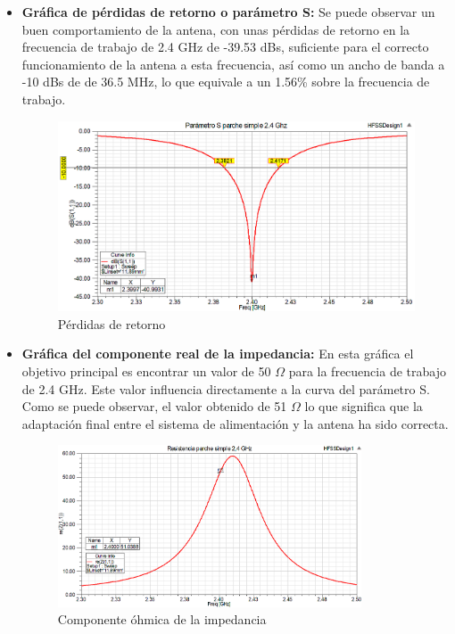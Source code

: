 \begin{itemize}
\item \textbf{Gráfica de pérdidas de retorno o parámetro S: }Se puede observar un buen comportamiento de la antena, con unas pérdidas de retorno en la frecuencia de trabajo de 2.4 GHz de -39.53 dBs, suficiente para el correcto funcionamiento de la antena a esta frecuencia, así como un ancho de banda a -10 dBs de de 36.5 MHz, lo que equivale a un 1.56\% sobre la frecuencia de trabajo.
	\begin{figure}[H]
    \centering
        \includegraphics[width=\textwidth]{archivos/analisis/1x11/1}
        \caption{Pérdidas de retorno}
        \label{fig:s}
	\end{figure}
	
\item \textbf{Gráfica del componente real de la impedancia: }En esta gráfica el objetivo principal es encontrar un valor de 50 $\Omega$ para la frecuencia de trabajo de 2.4 GHz. Este valor influencia directamente a la curva del parámetro S. Como se puede observar, el valor obtenido de 51 $\Omega$ lo que significa que la adaptación final entre el sistema de alimentación y la antena ha sido correcta.
	\begin{figure}[H]
    \centering
        \includegraphics[width=0.85\textwidth]{archivos/analisis/1x11/3}
        \caption{Componente óhmica de la impedancia}
        \label{fig:realimpe}
	\end{figure}
	

\end{itemize}
